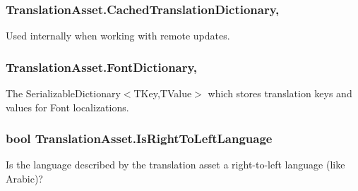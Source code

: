 \subsubsection[{\texorpdfstring{Cached\+Translation\+Dictionary}{CachedTranslationDictionary}}]{ Translation\+Asset.\+Cached\+Translation\+Dictionary\hspace{0.3cm}{\ttfamily [get]}, {\ttfamily [set]}}\hypertarget{class_translation_asset_a5a26cba32a5fab09ee1072ea0b626f4a}{}\label{class_translation_asset_a5a26cba32a5fab09ee1072ea0b626f4a}


Used internally when working with remote updates. 

\subsubsection[{\texorpdfstring{Font\+Dictionary}{FontDictionary}}]{ Translation\+Asset.\+Font\+Dictionary\hspace{0.3cm}{\ttfamily [get]}, {\ttfamily [set]}}\hypertarget{class_translation_asset_afcfa466e5de06d5da5aab787fb93d54f}{}\label{class_translation_asset_afcfa466e5de06d5da5aab787fb93d54f}


The Serializable\+Dictionary$<$\+T\+Key,\+T\+Value$>$ which stores translation keys and values for Font localizations. 

\subsubsection[{\texorpdfstring{Is\+Right\+To\+Left\+Language}{IsRightToLeftLanguage}}]{\setlength{\rightskip}{0pt plus 5cm}bool Translation\+Asset.\+Is\+Right\+To\+Left\+Language\hspace{0.3cm}{\ttfamily [get]}}\hypertarget{class_translation_asset_a63b9ef3eaf6d598babbced5f0df2a947}{}\label{class_translation_asset_a63b9ef3eaf6d598babbced5f0df2a947}


Is the language described by the translation asset a right-\/to-\/left language (like Arabic)? 


